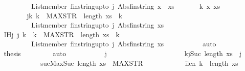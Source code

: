 \begin{isabellebody}
\ \ \ \ \ \ \ \ {\isasymlongrightarrow}\ List{\isachardot}member\ {\isacharparenleft}fin{\isacharunderscore}string{\isacharunderscore}upto\ j{\isacharparenright}\ {\isacharparenleft}Abs{\isacharunderscore}fin{\isacharunderscore}string\ {\isacharparenleft}x\ {\isacharhash}\ xs{\isacharparenright}{\isacharparenright}{\isacharparenright}{\isachardoublequoteclose}\isanewline
\ \ \ \ \isamarkupfalse%
\ \ k\ x\ xs\isanewline
\ \ \ \ \isamarkupfalse%
\ {\isacharminus}\isanewline
\ \ \ \ \ \ \isamarkupfalse%
\ {\isachardoublequoteopen}{\isasymforall}j{\isasymge}k{\isachardot}\ k\ {\isasymle}\ MAX{\isacharunderscore}STR\ {\isasymlongrightarrow}\ length\ xs\ {\isacharequal}\ k\ \isanewline
\ \ \ \ \ \ \ \ {\isasymlongrightarrow}\ List{\isachardot}member\ {\isacharparenleft}fin{\isacharunderscore}string{\isacharunderscore}upto\ j{\isacharparenright}\ {\isacharparenleft}Abs{\isacharunderscore}fin{\isacharunderscore}string\ xs{\isacharparenright}{\isachardoublequoteclose}\isanewline
\ \ \ \ \ \ \isamarkupfalse%
\ \isamarkupfalse%
\ IH{\isacharcolon}{\isachardoublequoteopen}{\isasymAnd}j{\isachardot}\ j{\isasymge}\ k\ {\isasymLongrightarrow}\ k\ {\isasymle}\ MAX{\isacharunderscore}STR\ {\isasymLongrightarrow}\ length\ xs\ {\isacharequal}\ k\ \isanewline
\ \ \ \ \ \ \ \ {\isasymLongrightarrow}\ List{\isachardot}member\ {\isacharparenleft}fin{\isacharunderscore}string{\isacharunderscore}upto\ j{\isacharparenright}\ {\isacharparenleft}Abs{\isacharunderscore}fin{\isacharunderscore}string\ xs{\isacharparenright}{\isachardoublequoteclose}\ \isanewline
\ \ \ \ \ \ \ \ \isamarkupfalse%
\ auto\isanewline
\ \ \ \ \ \ \isamarkupfalse%
\ {\isacharquery}thesis\isanewline
\ \ \ \ \ \ \ \ \isamarkupfalse%
{\isacharparenleft}auto{\isacharparenright}\isanewline
\ \ \ \ \ \ \ \ \isamarkupfalse%
\ \ j\isanewline
\ \ \ \ \ \ \ \ \isamarkupfalse%
\ {\isacharminus}\isanewline
\ \ \ \ \ \ \ \ \ \ \isamarkupfalse%
\ kj{\isacharcolon}{\isachardoublequoteopen}Suc\ {\isacharparenleft}length\ xs{\isacharparenright}\ {\isasymle}\ j{\isachardoublequoteclose}\isanewline
\ \ \ \ \ \ \ \ \ \ \isamarkupfalse%
\ sucMax{\isacharcolon}{\isachardoublequoteopen}Suc\ {\isacharparenleft}length\ xs{\isacharparenright}\ {\isasymle}\ MAX{\isacharunderscore}STR{\isachardoublequoteclose}\isanewline
\ \ \ \ \ \ \ \ \ \ \isamarkupfalse%
\ ilen{\isacharcolon}{\isachardoublequoteopen}\ k\ {\isacharequal}\ length\ xs{\isachardoublequoteclose}\isanewline

\end{isabellebody}
